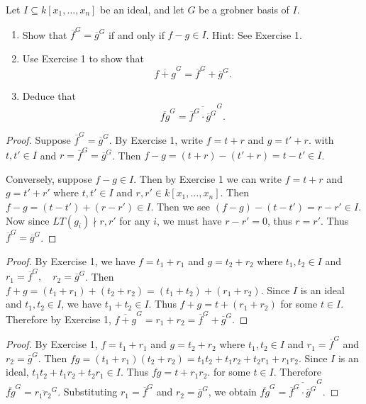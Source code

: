 \begin{tcolorbox}[title=Problem 13, breakable]
    Let $I \subseteq k[x_1, \ldots, x_n]$ be an ideal,
    and let $G$ be a grobner basis of $I$.
    \begin{enumerate}
        \item Show that $\overline{f}^G = \overline{g}^G$ if and only if $f - g \in I$. Hint: See Exercise 1.
        \item Use Exercise 1 to show that 
        \[\overline{f + g}^G = \overline{f}^G + \overline{g}^G.\]
        \item Deduce that 
        \[\overline{fg}^G = \overline{\overline{f}^G \cdot \overline{g}^G}^G.\]
    \end{enumerate}
\end{tcolorbox}

\begin{proof}
    Suppose $\overline{f}^G = \overline{g}^G$.  
    By Exercise 1, write $f = t + r$ and $g = t' + r$.
    with $t, t' \in I$ and $r = \overline{f}^G = \overline{g}^G$.  
    Then $f - g = (t + r) - (t' + r) = t - t' \in I$.

    Conversely, suppose $f - g \in I$. Then by Exercise 1 
    we can write $f = t + r$ and $g = t' + r'$ where $t, t' \in I$ and $r, r' \in k[x_1, \ldots, x_n]$.
    Then $f - g = (t - t') + (r - r') \in I$.
    Then we see  $(f - g) - (t - t') = r - r' \in I$.
    Now since $LT(g_i) \nmid r, r'$ for any $i$,
        we must have $r - r' = 0$, thus $r = r'$.
    Thus $\overline{f}^G = \overline{g}^G$.
\end{proof}

\begin{proof}
    By Exercise 1, we have $f = t_1 + r_1$ and $g = t_2 + r_2$
    where $t_1, t_2 \in I$ and $r_1 = \overline{f}^G, \quad r_2 = \overline{g}^G$.
    Then $f + g = (t_1 + r_1) + (t_2 + r_2) 
              = (t_1 + t_2) + (r_1 + r_2)$.
    Since $I$ is an ideal and $t_1, t_2 \in I$, we have $t_1 + t_2 \in I$.
    Thus $f + g = t + (r_1 + r_2)$
    for some $t \in I$. Therefore by Exercise 1, $\overline{f+g}^G = r_1 + r_2 = \overline{f}^G + \overline{g}^G$.
\end{proof}

\begin{proof}
    By Exercise 1, $f = t_1 + r_1$ and $g = t_2 + r_2$
    where $t_1, t_2 \in I$ and  $r_1 = \overline{f}^G$ and $r_2 = \overline{g}^G$.
    Then $fg = (t_1 + r_1)(t_2 + r_2)
           = t_1t_2 + t_1r_2 + t_2r_1 + r_1r_2$.
    Since $I$ is an ideal, $t_1t_2 + t_1r_2 + t_2r_1 \in I$.
    Thus $fg = t + r_1r_2$.
    for some $t \in I$. 
    Therefore $\overline{fg}^G = \overline{r_1r_2}^G$.
    Substituting $r_1 = \overline{f}^G$ and $r_2 = \overline{g}^G$, 
        we obtain $\overline{fg}^G = \overline{\overline{f}^G \cdot \overline{g}^G}^G$.
\end{proof}

